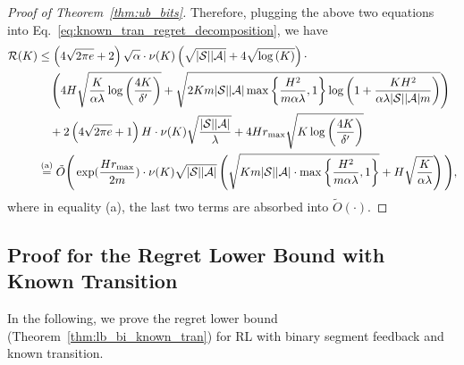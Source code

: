 \begin{proof}[Proof of Theorem~\ref{thm:ub_bits}]
	
	Therefore, plugging the above two equations into Eq.~\eqref{eq:known_tran_regret_decomposition}, we have
	\begin{align*}
		\mathcal{R}(K) &\leq \left( 4\sqrt{2\pi e} + 2 \right) \sqrt{\alpha} \cdot \nu(K) \left(  \sqrt{|\mathcal{S}||\mathcal{A}|} + 4 \sqrt{\log\left( K \right)}  \right) \cdot 
		\\
		&\quad \left(  4H\sqrt{ \frac{K}{\alpha \lambda} \log\left( \frac{4K}{\delta'} \right) } + \sqrt{ 2Km |\mathcal{S}| |\mathcal{A}|  \max\left\{  \frac{H^2}{m \alpha \lambda}, 1 \right\}  \log \left(  1+ \frac{  KH^2 }{ \alpha \lambda |\mathcal{S}| |\mathcal{A}| m }  \right) }   \right) 
		\\
		&\quad + 2 \left( 4\sqrt{2\pi e} + 1 \right) H \cdot \nu(K)  \sqrt{ \frac{|\mathcal{S}| |\mathcal{A}|}{\lambda} }  + 4 H r_{\max} \sqrt{ K \log\left( \frac{4K}{\delta'} \right) } 
		\\
		&\overset{\textup{(a)}}{=} \tilde{O} \Bigg( \exp(\frac{Hr_{\max}}{2m}) \cdot \nu(K) \sqrt{|\mathcal{S}||\mathcal{A}|} \left(  \sqrt{ Km |\mathcal{S}| |\mathcal{A}| \cdot \max\left\{  \frac{H^2}{m \alpha \lambda}, 1 \right\}  } + H\sqrt{ \frac{K}{\alpha \lambda} }   \right)
		\Bigg) ,
	\end{align*}
	where in equality (a), the last two terms are absorbed into $\tilde{O}(\cdot)$.
\end{proof}

\subsection{Proof for the Regret Lower Bound with Known Transition} \label{apx:lb_bi_known_tran}

In the following, we prove the regret lower bound (Theorem~\ref{thm:lb_bi_known_tran}) for RL with binary segment feedback and known transition.
	
